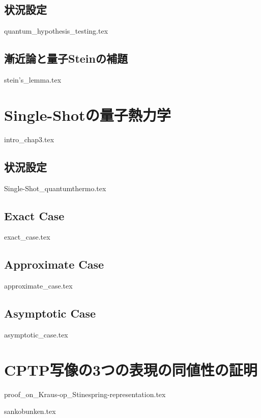 \documentclass[report]{jlreq}
\begin{document}
\section{状況設定}
{quantum_hypothesis_testing.tex}
\section{漸近論と量子Steinの補題}
{stein's_lemma.tex}

\chapter{Single-Shotの量子熱力学}
{intro_chap3.tex}

\section{状況設定}\label{sec.Single-Shot_quantumthermo}
{Single-Shot_quantumthermo.tex}
\section{Exact Case}
{exact_case.tex}
\section{Approximate Case}
{approximate_case.tex}
\section{Asymptotic Case}
{asymptotic_case.tex}


\pagestyle{appendix}

\appendix
\chapter{CPTP写像の3つの表現の同値性の証明}
{proof_on_Kraus-op_Stinespring-representation.tex}
  
\pagestyle{TOC}
{sankobunken.tex}
  
\end{document}
